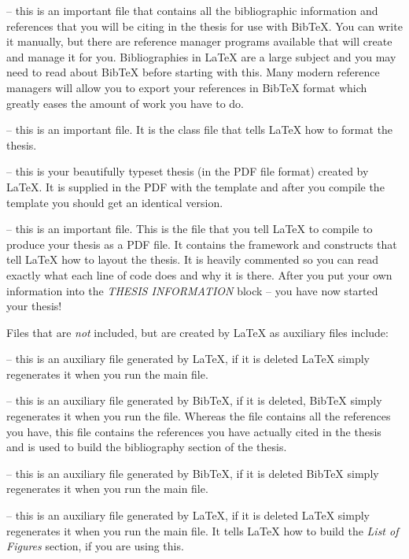  -- this is an important file that contains all the
bibliographic information and references that you will be citing in the
thesis for use with BibTeX. You can write it manually, but there are
reference manager programs available that will create and manage it for
you. Bibliographies in \LaTeX{} are a large subject and you may need to
read about BibTeX before starting with this. Many modern reference
managers will allow you to export your references in BibTeX format which
greatly eases the amount of work you have to do.

 -- this is an important file. It is the class file
that tells \LaTeX{} how to format the thesis.

 -- this is your beautifully typeset thesis (in the
PDF file format) created by \LaTeX{}. It is supplied in the PDF with the
template and after you compile the template you should get an identical
version.

 -- this is an important file. This is the file that
you tell \LaTeX{} to compile to produce your thesis as a PDF file. It
contains the framework and constructs that tell \LaTeX{} how to layout
the thesis. It is heavily commented so you can read exactly what each
line of code does and why it is there. After you put your own
information into the \emph{THESIS INFORMATION} block -- you have now
started your thesis!

Files that are \emph{not} included, but are created by \LaTeX{} as
auxiliary files include:

 -- this is an auxiliary file generated by \LaTeX{},
if it is deleted \LaTeX{} simply regenerates it when you run the main
 file.

 -- this is an auxiliary file generated by BibTeX, if
it is deleted, BibTeX simply regenerates it when you run the
 file. Whereas the  file contains all the
references you have, this  file contains the references you
have actually cited in the thesis and is used to build the bibliography
section of the thesis.

 -- this is an auxiliary file generated by BibTeX, if
it is deleted BibTeX simply regenerates it when you run the main
 file.

 -- this is an auxiliary file generated by \LaTeX{},
if it is deleted \LaTeX{} simply regenerates it when you run the main
 file. It tells \LaTeX{} how to build the \emph{List of
  Figures} section, if you are using this.


